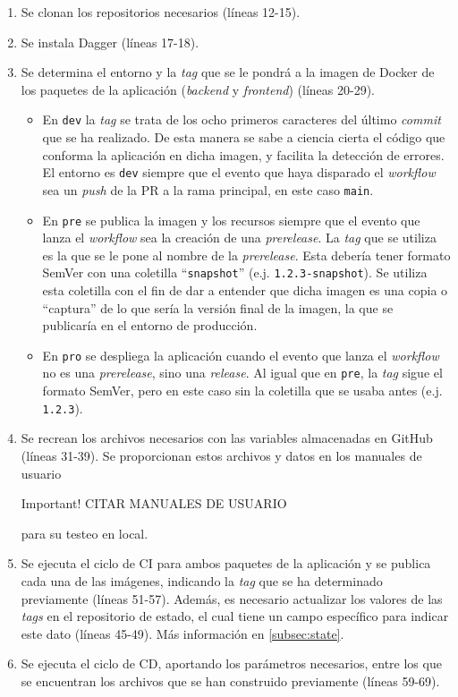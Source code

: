 \begin{enumerate}
  \item Se clonan los repositorios necesarios (líneas 12-15).
  \item Se instala Dagger (líneas 17-18).
  \item Se determina el entorno y la \textit{tag} que se le pondrá a la imagen de Docker de los paquetes de la aplicación (\textit{backend} y \textit{frontend}) (líneas 20-29).
    \begin{itemize}
      \item En \texttt{dev} la \textit{tag} se trata de los ocho primeros caracteres del último \textit{commit} que se ha realizado. De esta manera se sabe a ciencia cierta el código que conforma la aplicación en dicha imagen, y facilita la detección de errores. El entorno es \texttt{dev} siempre que el evento que haya disparado el \textit{workflow} sea un \textit{push} de la PR a la rama principal, en este caso \texttt{main}.
      \item En \texttt{pre} se publica la imagen y los recursos siempre que el evento que lanza el \textit{workflow} sea la creación de una \textit{prerelease}. La \textit{tag} que se utiliza es la que se le pone al nombre de la \textit{prerelease}. Esta debería tener formato SemVer\cite{semver} con una coletilla ``\texttt{snapshot}'' (e.j. \texttt{1.2.3-snapshot}). Se utiliza esta coletilla con el fin de dar a entender que dicha imagen es una copia o ``captura'' de lo que sería la versión final de la imagen, la que se publicaría en el entorno de producción.
      \item En \texttt{pro} se despliega la aplicación cuando el evento que lanza el \textit{workflow} no es una \textit{prerelease}, sino una \textit{release}. Al igual que en \texttt{pre}, la \textit{tag} sigue el formato SemVer, pero en este caso sin la coletilla que se usaba antes (e.j. \texttt{1.2.3}).
    \end{itemize}
     
  \item Se recrean los archivos necesarios con las variables almacenadas en GitHub (líneas 31-39). Se proporcionan estos archivos y datos en los manuales de usuario
    \begin{bclogo}[logo=\bcattention]{Important!}
      CITAR MANUALES DE USUARIO
    \end{bclogo}
    para su testeo en local.
  \item Se ejecuta el ciclo de CI para ambos paquetes de la aplicación y se publica cada una de las imágenes, indicando la \textit{tag} que se ha determinado previamente (líneas 51-57). Además, es necesario actualizar los valores de las \textit{tags} en el repositorio de estado, el cual tiene un campo específico para indicar este dato (líneas 45-49). Más información en \ref{subsec:state}.
  \item Se ejecuta el ciclo de CD, aportando los parámetros necesarios, entre los que se encuentran los archivos que se han construido previamente (líneas 59-69).
\end{enumerate}


